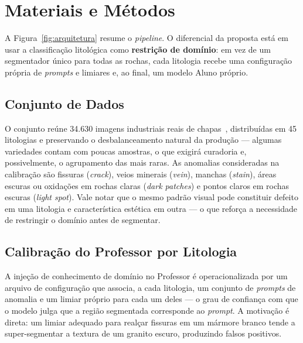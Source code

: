 \documentclass[10pt,conference]{IEEEtran}
\begin{document}
\section{Materiais e Métodos}

A Figura~\ref{fig:arquitetura} resume o \textit{pipeline}. O diferencial da proposta está em usar a classificação litológica como \textbf{restrição de domínio}: em vez de um segmentador único para todas as rochas, cada litologia recebe uma configuração própria de \textit{prompts} e limiares e, ao final, um modelo Aluno próprio.

\subsection{Conjunto de Dados}

O conjunto reúne 34.630 imagens industriais reais de chapas~\cite{dataset_araujo2023}, distribuídas em 45 litologias e preservando o desbalanceamento natural da produção --- algumas variedades contam com poucas amostras, o que exigirá curadoria e, possivelmente, o agrupamento das mais raras. As anomalias consideradas na calibração são fissuras (\textit{crack}), veios minerais (\textit{vein}), manchas (\textit{stain}), áreas escuras ou oxidações em rochas claras (\textit{dark patches}) e pontos claros em rochas escuras (\textit{light spot}). Vale notar que o mesmo padrão visual pode constituir defeito em uma litologia e característica estética em outra --- o que reforça a necessidade de restringir o domínio antes de segmentar.

\subsection{Calibração do Professor por Litologia}

A injeção de conhecimento de domínio no Professor é operacionalizada por um arquivo de configuração que associa, a cada litologia, um conjunto de \textit{prompts} de anomalia e um limiar próprio para cada um deles --- o grau de confiança com que o modelo julga que a região segmentada corresponde ao \textit{prompt}. A motivação é direta: um limiar adequado para realçar fissuras em um mármore branco tende a super-segmentar a textura de um granito escuro, produzindo falsos positivos.
\end{document}

